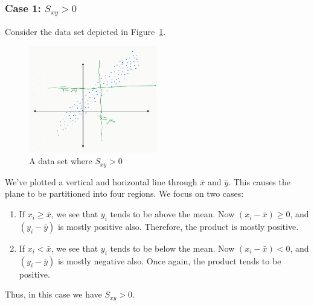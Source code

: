 \documentclass[12pt, a4paper]{article}
\theoremstyle{definition}
\begin{document}
	\subsubsection*{Case 1: $S_{xy} > 0$}
	Consider the data set depicted in Figure~\ref{fig:dataset-positive_{sxy}}.
	\begin{figure}
		\centering
		\includegraphics[width=0.5\textwidth]{positive-covariance-rvs}
		\caption{A data set where $S_{xy}>0$}
		\label{fig:dataset-positive_{sxy}}
	\end{figure}
	We've plotted a vertical and horizontal line through $\bar{x}$ and $\bar{y}$. This causes
	the plane to be partitioned into four regions. We focus on two cases:
	\begin{enumerate}[label=(\roman*)]
		\item If $x_i\geq \bar{x}$, we see that $y_i$ tends to be above the mean.
		Now $(x_i - \bar{x})\geq 0$, and $(y_i-\bar{y})$ is mostly positive also.
		Therefore, the product is mostly positive.
		\item If $x_i < \bar{x}$, we see that $y_i$ tends to be below the mean.
		Now $(x_i-\bar{x})<0$, and $(y_i-\bar{y})$ is mostly negative also.
		Once again, the product tends to be positive.
	\end{enumerate}
	Thus, in this case we have $S_{xy}>0$.
\end{document}
